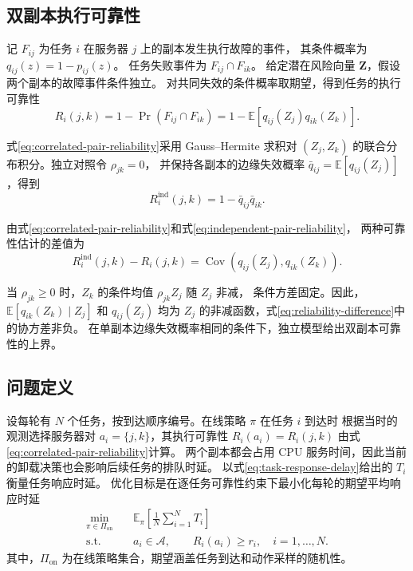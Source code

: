 \documentclass[UTF8,fontset=fandol]{ctexart}
\begin{document}
\subsection{双副本执行可靠性}
\label{sec:dual-replica-reliability}

记 \(F_{ij}\) 为任务 \(i\) 在服务器 \(j\) 上的副本发生执行故障的事件，
其条件概率为 \(q_{ij}(z)=1-p_{ij}(z)\)。
任务失败事件为 \(F_{ij}\cap F_{ik}\)。
给定潜在风险向量 \(\boldsymbol{Z}\)，假设两个副本的故障事件条件独立。
对共同失效的条件概率取期望，得到任务的执行可靠性
\begin{equation}
  R_i(j,k)=1-\Pr(F_{ij}\cap F_{ik})
  =1-\mathbb{E}\!\left[q_{ij}(Z_j)q_{ik}(Z_k)\right].
  \label{eq:correlated-pair-reliability}
\end{equation}

式\eqref{eq:correlated-pair-reliability}采用 Gauss--Hermite 求积对
\((Z_j,Z_k)\) 的联合分布积分。独立对照令 \(\rho_{jk}=0\)，
并保持各副本的边缘失效概率 \(\bar{q}_{ij}=\mathbb{E}[q_{ij}(Z_j)]\)，得到
\begin{equation}
  R_i^{\mathrm{ind}}(j,k)=1-\bar{q}_{ij}\bar{q}_{ik}.
  \label{eq:independent-pair-reliability}
\end{equation}

由式\eqref{eq:correlated-pair-reliability}和式\eqref{eq:independent-pair-reliability}，
两种可靠性估计的差值为
\begin{equation}
  R_i^{\mathrm{ind}}(j,k)-R_i(j,k)
  =\operatorname{Cov}\!\left(q_{ij}(Z_j),q_{ik}(Z_k)\right).
  \label{eq:reliability-difference}
\end{equation}

当 \(\rho_{jk}\geq 0\) 时，\(Z_k\) 的条件均值 \(\rho_{jk}Z_j\) 随 \(Z_j\) 非减，
条件方差固定。因此，\(\mathbb{E}[q_{ik}(Z_k)\mid Z_j]\) 和 \(q_{ij}(Z_j)\)
均为 \(Z_j\) 的非减函数，式\eqref{eq:reliability-difference}中的协方差非负。
在单副本边缘失效概率相同的条件下，独立模型给出双副本可靠性的上界。

\subsection{问题定义}
\label{sec:offloading-problem}

设每轮有 \(N\) 个任务，按到达顺序编号。在线策略 \(\pi\) 在任务 \(i\) 到达时
根据当时的观测选择服务器对 \(a_i=\{j,k\}\)，其执行可靠性
\(R_i(a_i)=R_i(j,k)\) 由式\eqref{eq:correlated-pair-reliability}计算。
两个副本都会占用 CPU 服务时间，因此当前的卸载决策也会影响后续任务的排队时延。
以式\eqref{eq:task-response-delay}给出的 \(T_i\) 衡量任务响应时延。
优化目标是在逐任务可靠性约束下最小化每轮的期望平均响应时延
\begin{equation}
  \begin{aligned}
    \min_{\pi\in\Pi_{\mathrm{on}}}\quad
      & \mathbb{E}_{\pi}\!\left[\frac{1}{N}\sum_{i=1}^{N}T_i\right] \\
    \text{s.t.}\quad
      & a_i\in\mathcal{A},\qquad R_i(a_i)\geq r_i,\quad i=1,\ldots,N .
  \end{aligned}
  \label{eq:offloading-problem}
\end{equation}
其中，\(\Pi_{\mathrm{on}}\) 为在线策略集合，期望涵盖任务到达和动作采样的随机性。
\end{document}
